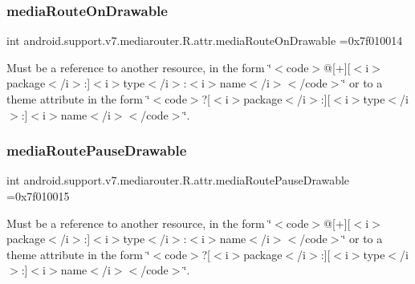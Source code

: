 \subsubsection{\texorpdfstring{media\+Route\+On\+Drawable}{mediaRouteOnDrawable}}
{\footnotesize\ttfamily int android.\+support.\+v7.\+mediarouter.\+R.\+attr.\+media\+Route\+On\+Drawable =0x7f010014\hspace{0.3cm}{\ttfamily [static]}}

Must be a reference to another resource, in the form \char`\"{}$<$code$>$@\mbox{[}+\mbox{]}\mbox{[}$<$i$>$package$<$/i$>$\+:\mbox{]}$<$i$>$type$<$/i$>$\+:$<$i$>$name$<$/i$>$$<$/code$>$\char`\"{} or to a theme attribute in the form \char`\"{}$<$code$>$?\mbox{[}$<$i$>$package$<$/i$>$\+:\mbox{]}\mbox{[}$<$i$>$type$<$/i$>$\+:\mbox{]}$<$i$>$name$<$/i$>$$<$/code$>$\char`\"{}. \mbox{\label{classandroid_1_1support_1_1v7_1_1mediarouter_1_1R_1_1attr_aa797097a0b224336ab6d78fedc5e8de3}} 
\subsubsection{\texorpdfstring{media\+Route\+Pause\+Drawable}{mediaRoutePauseDrawable}}
{\footnotesize\ttfamily int android.\+support.\+v7.\+mediarouter.\+R.\+attr.\+media\+Route\+Pause\+Drawable =0x7f010015\hspace{0.3cm}{\ttfamily [static]}}

Must be a reference to another resource, in the form \char`\"{}$<$code$>$@\mbox{[}+\mbox{]}\mbox{[}$<$i$>$package$<$/i$>$\+:\mbox{]}$<$i$>$type$<$/i$>$\+:$<$i$>$name$<$/i$>$$<$/code$>$\char`\"{} or to a theme attribute in the form \char`\"{}$<$code$>$?\mbox{[}$<$i$>$package$<$/i$>$\+:\mbox{]}\mbox{[}$<$i$>$type$<$/i$>$\+:\mbox{]}$<$i$>$name$<$/i$>$$<$/code$>$\char`\"{}. \mbox{\label{classandroid_1_1support_1_1v7_1_1mediarouter_1_1R_1_1attr_a12d4fc82a43e3340534cafccd0708ac6}} 
